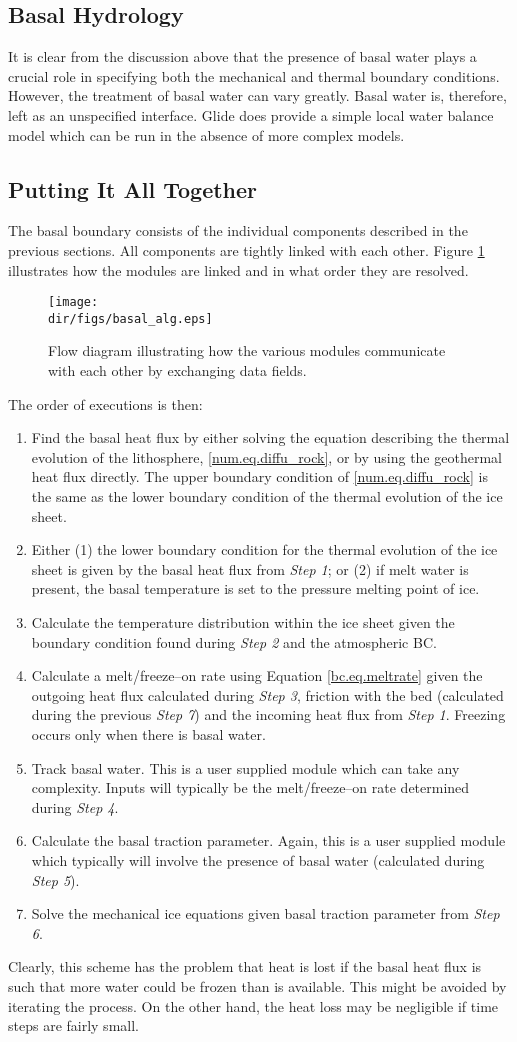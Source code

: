 

\subsection{Basal Hydrology}
It is clear from the discussion above that the presence of basal water plays a crucial role in specifying both the mechanical and thermal boundary conditions. However, the treatment of basal water can vary greatly. Basal water is, therefore, left as an unspecified interface. Glide does provide a simple local water balance model which can be run in the absence of more complex models.

\subsection{Putting It All Together}
The basal boundary consists of the individual components described in the previous sections. All components are tightly linked with each other. Figure \ref{num.fig.bc_flow} illustrates how the modules are linked and in what order they are resolved.
\begin{figure}[htbp]
  \centering
  \texttt{[image: \\dir/figs/basal\_alg.eps]}
  \caption{Flow diagram illustrating how the various modules communicate with each other by exchanging data fields.}
  \label{num.fig.bc_flow}
\end{figure}
The order of executions is then:
\begin{enumerate}
\item Find the basal heat flux by either solving the equation describing the thermal evolution of the lithosphere, \eqref{num.eq.diffu_rock}, or by using the geothermal heat flux directly. The upper boundary condition of \eqref{num.eq.diffu_rock} is the same as the lower boundary condition of the thermal evolution of the ice sheet.
\item Either (1) the lower boundary condition for the thermal evolution of the ice sheet is given by the basal heat flux from \emph{Step 1}; or (2) if melt water is present, the basal temperature is set to the pressure melting point of ice.
\item Calculate the temperature distribution within the ice sheet given the boundary condition found during \emph{Step 2} and the atmospheric BC.
\item Calculate a melt/freeze--on rate using Equation \eqref{bc.eq.meltrate} given the outgoing heat flux calculated during \emph{Step 3}, friction with the bed (calculated during the previous \emph{Step 7}) and the incoming heat flux from \emph{Step 1}. Freezing occurs only when there is basal water.
\item Track basal water. This is a user supplied module which can take any complexity. Inputs will typically be the melt/freeze--on rate determined during \emph{Step 4}.
\item Calculate the basal traction parameter. Again, this is a user supplied module which typically will involve the presence of basal water (calculated during \emph{Step 5}).
\item Solve the mechanical ice equations given basal traction parameter from \emph{Step 6}.
\end{enumerate}
Clearly, this scheme has the problem that heat is lost if the basal heat flux is such that more water could be frozen than is available. This might be avoided by iterating the process. On the other hand, the heat loss may be negligible if time steps are fairly small.
